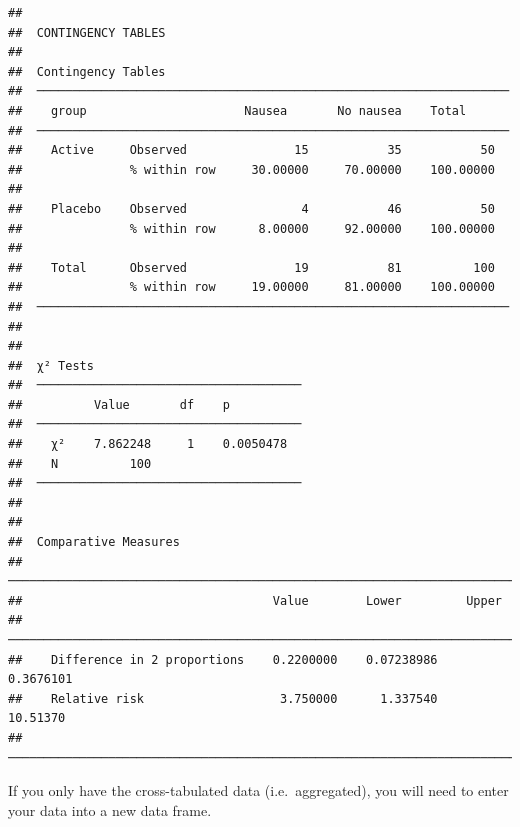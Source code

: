 \documentclass[
]{memoir}
\begin{document}
\begin{verbatim}
## 
##  CONTINGENCY TABLES
## 
##  Contingency Tables                                                 
##  ────────────────────────────────────────────────────────────────── 
##    group                      Nausea       No nausea    Total       
##  ────────────────────────────────────────────────────────────────── 
##    Active     Observed               15           35           50   
##               % within row     30.00000     70.00000    100.00000   
##                                                                     
##    Placebo    Observed                4           46           50   
##               % within row      8.00000     92.00000    100.00000   
##                                                                     
##    Total      Observed               19           81          100   
##               % within row     19.00000     81.00000    100.00000   
##  ────────────────────────────────────────────────────────────────── 
## 
## 
##  χ² Tests                              
##  ───────────────────────────────────── 
##          Value       df    p           
##  ───────────────────────────────────── 
##    χ²    7.862248     1    0.0050478   
##    N          100                      
##  ───────────────────────────────────── 
## 
## 
##  Comparative Measures                                                    
##  ─────────────────────────────────────────────────────────────────────── 
##                                   Value        Lower         Upper       
##  ─────────────────────────────────────────────────────────────────────── 
##    Difference in 2 proportions    0.2200000    0.07238986    0.3676101   
##    Relative risk                   3.750000      1.337540     10.51370   
##  ───────────────────────────────────────────────────────────────────────
\end{verbatim}

If you only have the cross-tabulated data (i.e.~aggregated), you will need to enter your data into a new data frame.
\end{document}
